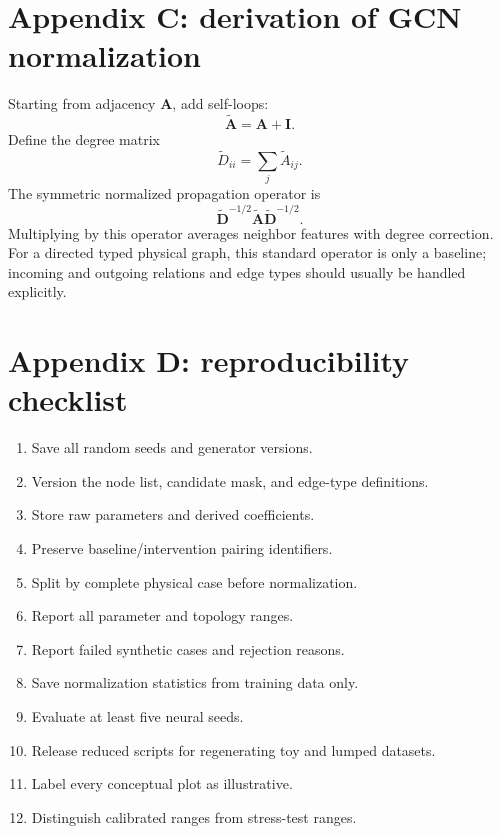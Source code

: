 \documentclass[11pt]{article}
\newcommand{\Amat}{\bm{A}}
\newcommand{\Dmat}{\bm{D}}
\newcommand{\Id}{\bm{I}}
\begin{document}
\section{Appendix C: derivation of GCN normalization}

Starting from adjacency \(\Amat\), add self-loops:
\begin{equation}
\widetilde{\Amat}=\Amat+\Id.
\end{equation}
Define the degree matrix
\begin{equation}
\widetilde{D}_{ii}=\sum_j\widetilde{A}_{ij}.
\end{equation}
The symmetric normalized propagation operator is
\begin{equation}
\widetilde{\Dmat}^{-1/2}\widetilde{\Amat}\widetilde{\Dmat}^{-1/2}.
\end{equation}
Multiplying by this operator averages neighbor features with degree correction. For a directed typed physical graph, this standard operator is only a baseline; incoming and outgoing relations and edge types should usually be handled explicitly.

\section{Appendix D: reproducibility checklist}

\begin{enumerate}[leftmargin=1.6em]
    \item Save all random seeds and generator versions.
    \item Version the node list, candidate mask, and edge-type definitions.
    \item Store raw parameters and derived coefficients.
    \item Preserve baseline/intervention pairing identifiers.
    \item Split by complete physical case before normalization.
    \item Report all parameter and topology ranges.
    \item Report failed synthetic cases and rejection reasons.
    \item Save normalization statistics from training data only.
    \item Evaluate at least five neural seeds.
    \item Release reduced scripts for regenerating toy and lumped datasets.
    \item Label every conceptual plot as illustrative.
    \item Distinguish calibrated ranges from stress-test ranges.
\end{enumerate}
\end{document}
